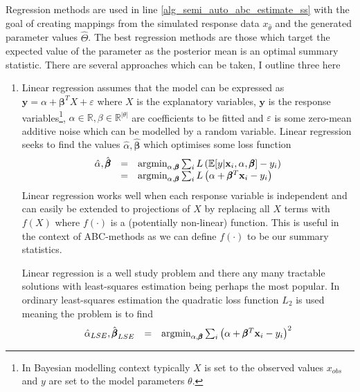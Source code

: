 \documentclass[11pt,a4paper]{article}
\newcommand*{\expect}{\mathbb{E}}
\theoremstyle{break}
\begin{document}
  \par Regression methods are used in line \ref{alg_semi_auto_abc_estimate_ss} with the goal of creating mappings from the simulated response data $x_{\hat\theta}$ and the generated parameter values $\hat\Theta$. The best regression methods are those which target the expected value of the parameter as the posterior mean is an optimal summary statistic. There are several approaches which can be taken, I outline three here
  \begin{enumerate} %
    \everymath={\displaystyle}
    \item Linear regression \cite[]{constructing_summary_statistics_for_approximate_bayesian_computation_semi_automatic_ABC} assumes that the model can be expressed as $\mathbf{y}=\alpha+\pmb\beta^T X+\varepsilon$ where $X$ is the explanatory variables, $\mathbf{y}$ is the response variables\footnote{In Bayesian modelling context typically $X$ is set to the observed values $x_{obs}$ and $y$ are set to the model parameters $\theta$.}, $\alpha\in\mathbb{R},\beta\in\mathbb{R}^{|\theta|}$ are coefficients to be fitted and $\varepsilon$ is some zero-mean additive noise which can be modelled by a random variable. Linear regression seeks to find the values $\hat\alpha,\hat{\pmb\beta}$ which optimises some loss function
    \[\begin{array}{rcl}
      \everymath={\displaystyle}
      \hat\alpha,\hat{\pmb\beta}&=&\text{argmin}_{\alpha,\pmb\beta}\sum_i L\left(\expect[y|\mathbf{x}_i,\alpha,\pmb\beta]-y_i\right)\\
      &=&\text{argmin}_{\alpha,\pmb\beta}\sum_i L\left(\alpha+\pmb\beta^T\mathbf{x}_i-y_i\right)
    \end{array}\]
    Linear regression works well when each response variable is independent and  can easily be extended to projections of $X$ by replacing all $X$ terms with $f(X)$ where $f(\cdot)$ is a (potentially non-linear) function. This is useful in the context of ABC-methods as we can define $f(\cdot)$ to be our summary statistics.
    \par Linear regression is a well study problem and there any many tractable solutions with least-squares estimation being perhaps the most popular. In ordinary least-squares estimation the quadratic loss function $L_2$ is used meaning the problem is to find
    \[\begin{array}{rcl}
      \everymath={\displaystyle}
      \hat\alpha_{LSE},\hat{\pmb\beta}_{LSE}&=&\text{argmin}_{\alpha,\pmb\beta}\sum_i \left(\alpha+\pmb\beta^T\mathbf{x}_i-y_i\right)^2\\

\end{array}\]
\end{enumerate}
\end{document}

